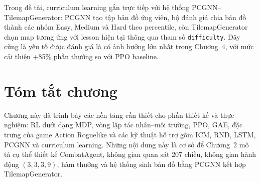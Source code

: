 Trong đề tài, curriculum learning gắn trực tiếp với hệ thống PCGNN--TilemapGenerator: PCGNN tạo tập bản đồ ứng viên, bộ đánh giá chia bản đồ thành các nhóm Easy, Medium và Hard theo percentile, còn TilemapGenerator chọn map tương ứng với lesson hiện tại thông qua tham số \texttt{difficulty}. Đây cũng là yếu tố được đánh giá là có ảnh hưởng lớn nhất trong Chương~4, với mức cải thiện +85\% phần thưởng so với PPO baseline.

\section{Tóm tắt chương}

Chương này đã trình bày các nền tảng cần thiết cho phần thiết kế và thực nghiệm: RL dưới dạng MDP, vòng lặp tác nhân--môi trường, PPO, GAE, đặc trưng của game Action Roguelike và các kỹ thuật hỗ trợ gồm ICM, RND, LSTM, PCGNN và curriculum learning. Những nội dung này là cơ sở để Chương~2 mô tả cụ thể thiết kế CombatAgent, không gian quan sát 207 chiều, không gian hành động $(3,3,3,9)$, hàm thưởng và hệ thống sinh bản đồ bằng PCGNN kết hợp TilemapGenerator.
